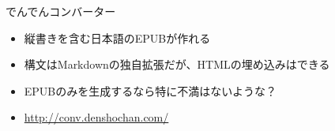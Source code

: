 %  
%
%
%  
%

\begin{frame}[containsverbatim, t]{\inhibitglue でんでんコンバーター}
  \sffamily
  
  \begin{itemize}
    \item 縦書きを含む日本語のEPUBが作れる
    \item 構文はMarkdownの独自拡張だが、HTMLの埋め込みはできる
    \item EPUBのみを生成するなら特に不満はないような？
    \item \url{http://conv.denshochan.com/}
  \end{itemize}

\end{frame}

%  
%


